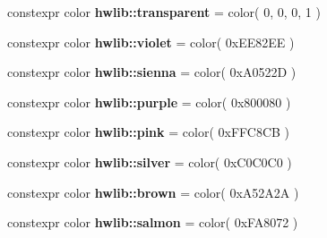 \begin{DoxyCompactItemize}
constexpr color {\bfseries hwlib\+::transparent} = color( 0, 0, 0, 1 )
\item 
\mbox{\label{namespacehwlib_a598c038a15212ae56dd81d9708d8a692}} 
constexpr color {\bfseries hwlib\+::violet} = color( 0x\+E\+E82\+E\+E )
\item 
\mbox{\label{namespacehwlib_a02e4f7453a14dadbabef58265598fef8}} 
constexpr color {\bfseries hwlib\+::sienna} = color( 0x\+A0522\+D )
\item 
\mbox{\label{namespacehwlib_aba67bcd5e03f50432e45dc75fe432d46}} 
constexpr color {\bfseries hwlib\+::purple} = color( 0x800080 )
\item 
\mbox{\label{namespacehwlib_a2c264d06505f223a3028b1790394849a}} 
constexpr color {\bfseries hwlib\+::pink} = color( 0x\+F\+F\+C8\+C\+B )
\item 
\mbox{\label{namespacehwlib_a7d764d6d86f662651b76e55da87b5c8f}} 
constexpr color {\bfseries hwlib\+::silver} = color( 0x\+C0\+C0\+C0 )
\item 
\mbox{\label{namespacehwlib_ad3126003784f3b5235989591d8264c0d}} 
constexpr color {\bfseries hwlib\+::brown} = color( 0x\+A52\+A2\+A )
\item 
\mbox{\label{namespacehwlib_ad15ba22024321378147c49e5dc17cad2}} 
constexpr color {\bfseries hwlib\+::salmon} = color( 0x\+F\+A8072 )
\end{DoxyCompactItemize}

